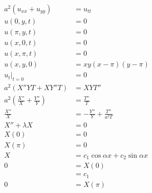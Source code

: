 \documentclass{article}
\begin{document}
\setcounter{subsubsection}{2}
\subsubsection{}

\begin{align*}
  a^2 (u_{x x} + u_{y y})                          & = u_{t t}                               \\
  u(0, y, t)                                       & = 0                                     \\
  u(\pi, y, t)                                     & = 0                                     \\
  u(x, 0, t)                                       & = 0                                     \\
  u(x, \pi, t)                                     & = 0                                     \\
  u(x, y, 0)                                       & = x y (x - \pi) (y - \pi)               \\
  u_t|_{t = 0}                                     & = 0                                     \\
  a^2 (X'' Y T + X Y'' T)                          & = X Y T''                               \\
  a^2 \left( \frac{X''}{X} + \frac{Y''}{Y} \right) & = \frac{T''}{T}                         \\
  \frac{X''}{X}                                    & = -\frac{Y''}{Y} + \frac{T''}{a^2 T}    \\
  X'' + \lambda X                                  & = 0                                     \\
  X(0)                                             & = 0                                     \\
  X(\pi)                                           & = 0                                     \\
  X                                                & = c_1 \cos \alpha x + c_2 \sin \alpha x \\
  0                                                & = X(0)                                  \\
                                                   & = c_1                                   \\
  0                                                & = X(\pi)                                \\

\end{align*}
\end{document}
